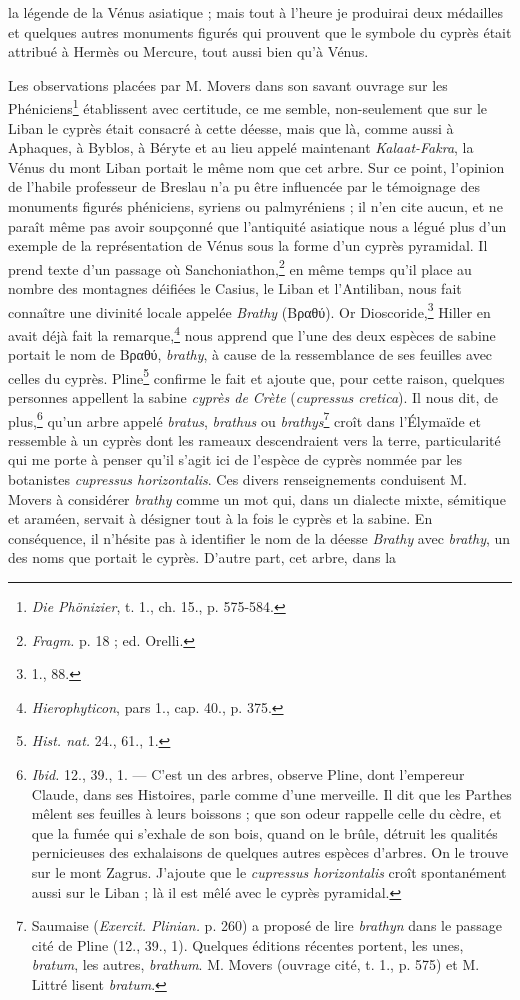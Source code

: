 \documentclass{article}
\begin{document}
la légende de la Vénus asiatique ; mais tout à l'heure je produirai deux médailles et quelques autres monuments figurés qui prouvent que le symbole du cyprès était attribué à Hermès ou Mercure, tout aussi bien qu'à Vénus.

Les observations placées par M. Movers dans son savant ouvrage sur les Phéniciens\footnote{\emph{Die Phönizier}, t. 1., ch. 15., p. 575-584.} établissent avec certitude, ce me semble, non-seulement que sur le Liban le cyprès était consacré à cette déesse, mais que là, comme aussi à Aphaques, à Byblos, à Béryte et au lieu appelé maintenant \emph{Kalaat-Fakra}, la Vénus du mont Liban portait le même nom que cet arbre. Sur ce point, l'opinion de l'habile professeur de Breslau n'a pu être influencée par le témoignage des monuments figurés phéniciens, syriens ou palmyréniens ; il n'en cite aucun, et ne paraît même pas avoir soupçonné que l'antiquité asiatique nous a légué plus d'un exemple de la représentation de Vénus sous la forme d'un cyprès pyramidal. Il prend texte d'un passage où Sanchoniathon,\footnote{\emph{Fragm.} p. 18 ; ed. Orelli.} en même temps qu'il place au nombre des montagnes déifiées le Casius, le Liban et l'Antiliban, nous fait connaître une divinité locale appelée \emph{Brathy} (\textgreek{Βραθύ}). Or Dioscoride,\footnote{1., 88.} Hiller en avait déjà fait la remarque,\footnote{\emph{Hierophyticon}, pars 1., cap. 40., p. 375.} nous apprend que l'une des deux espèces de sabine portait le nom de \textgreek{Βραθύ}, \emph{brathy}, à cause de la ressemblance de ses feuilles avec celles du cyprès. Pline\footnote{\emph{Hist. nat.} 24., 61., 1.} confirme le fait et ajoute que, pour cette raison, quelques personnes appellent la sabine \emph{cyprès de Crète} (\emph{cupressus cretica}). Il nous dit, de plus,\footnote{\emph{Ibid.} 12., 39., 1. --- C'est un des arbres, observe Pline, dont l'empereur Claude, dans ses Histoires, parle comme d'une merveille. Il dit que les Parthes mêlent ses feuilles à leurs boissons ; que son odeur rappelle celle du cèdre, et que la fumée qui s'exhale de son bois, quand on le brûle, détruit les qualités pernicieuses des exhalaisons de quelques autres espèces d'arbres. On le trouve sur le mont Zagrus. J'ajoute que le \emph{cupressus horizontalis} croît spontanément aussi sur le Liban ; là il est mêlé avec le cyprès pyramidal.} qu'un arbre appelé \emph{bratus}, \emph{brathus} ou \emph{brathys}\footnote{Saumaise (\emph{Exercit. Plinian.} p. 260) a proposé de lire \emph{brathyn} dans le passage cité de Pline (12., 39., 1). Quelques éditions récentes portent, les unes, \emph{bratum}, les autres, \emph{brathum}. M. Movers (ouvrage cité, t. 1., p. 575) et M. Littré lisent \emph{bratum}.} croît dans l'Élymaïde et ressemble à un cyprès dont les rameaux descendraient vers la terre, particularité qui me porte à penser qu'il s'agit ici de l'espèce de cyprès nommée par les botanistes \emph{cupressus horizontalis}. Ces divers renseignements conduisent M. Movers à considérer \emph{brathy} comme un mot qui, dans un dialecte mixte, sémitique et araméen, servait à désigner tout à la fois le cyprès et la sabine. En conséquence, il n'hésite pas à identifier le nom de la déesse \emph{Brathy} avec \emph{brathy}, un des noms que portait le cyprès. D'autre part, cet arbre, dans la 
\end{document}
